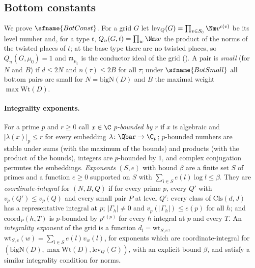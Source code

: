 \subsection{Bottom constants}\label{sec:pf:fit:botconst}

We prove $\sfname{BotConst}$. For a grid $G$ let $\mathrm{lev}_Q(G)=\prod_{v\in S_0}\Nm v^{c(v)}$ be its level number and, for
a type $t$, $Q_n(G,t)=\prod_w\Nm w$ the product of the norms of the twisted places of $t$; at the base type there are no twisted
places, so $Q_n(G,\mu_0)=1$ and $\mathfrak m_{\mu_0}$ is the conductor ideal of the grid
(). A pair is \emph{small} (for $N$ and $B$) if $d\le2N$ and $n(\tau)\le2B$ for
all $\tau$; under $\sfname{BotSmall}$ all bottom pairs are small for $N=\mathrm{bigN}(D)$ and $B$ the maximal weight
$\max\mathrm{Wt}(D)$.

\paragraph{Integrality exponents.} For a prime $p$ and $r\ge0$ call $x\in\C$ \emph{$p$-bounded by $r$} if $x$ is algebraic and
$|\lambda(x)|_p\le r$ for every embedding $\lambda\colon\Qbar\to\C_p$; $p$-bounded numbers are stable under sums (with the
maximum of the bounds) and products (with the product of the bounds), integers are $p$-bounded by $1$, and complex conjugation
permutes the embeddings. \emph{Exponents} $(S,e)$ with bound $\beta$ are a finite set $S$ of primes and a function $e\ge0$
supported on $S$ with $\sum_{l\in S}e(l)\log l\le\beta$. They are \emph{coordinate-integral} for $(N,B,Q)$ if for every prime
$p$, every $Q'$ with $v_p(Q')\le v_p(Q)$ and every small pair $P$ at level $Q'$: every class of $\mathrm{Cls}(d,J)$ has a
representative integral at $p$; $|\Gamma_h|\ne0$ and $v_p(|\Gamma_h|)\le e(p)$ for all $h$; and $\mathrm{coord}_P(h,T)$ is
$p$-bounded by $p^{e(p)}$ for every $h$ integral at $p$ and every $T$. An \emph{integrality exponent} of the grid is a function
$d_l=\mathrm{wt}_{S,e}$, $\mathrm{wt}_{S,e}(w)=\sum_{l\in S}e(l)v_w(l)$, for exponents which are coordinate-integral for
$(\mathrm{bigN}(D),\max\mathrm{Wt}(D),\mathrm{lev}_Q(G))$, with an explicit bound $\beta$, and satisfy a similar integrality
condition for norms.

